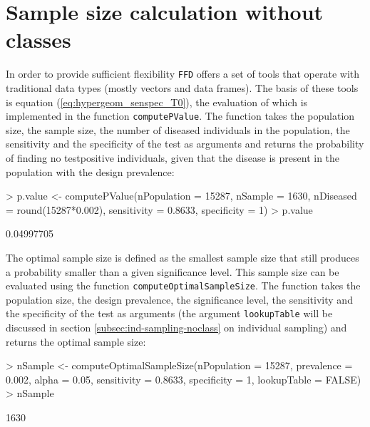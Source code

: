 \documentclass[nojss]{jss}
\begin{document}
%
%

\section{Sample size calculation without classes}
\label{sec:using-ffd-noclass}

In order to provide sufficient flexibility \texttt{FFD} offers a set 
of tools that operate with traditional data types (mostly vectors 
and data frames). The basis of these tools is equation 
(\ref{eq:hypergeom_senspec_T0}), the evaluation of which is 
implemented in the function \texttt{computePValue}. 
 The function takes the population 
size, the sample size, the number of diseased individuals in the 
population, the sensitivity and the specificity of the test as 
arguments and returns the probability of finding no testpositive 
individuals, given that the disease is present in the population 
with the design prevalence: 

\begin{Schunk}
\begin{Sinput}
> p.value <- computePValue(nPopulation = 15287, nSample = 1630, 
       nDiseased = round(15287*0.002), sensitivity = 0.8633, specificity = 1)
> p.value
\end{Sinput}
\begin{Soutput}
[1] 0.04997705
\end{Soutput}
\end{Schunk}

The optimal sample size is defined as the smallest sample size that 
still produces a probability smaller than a given significance 
level. This sample size can be evaluated using the function 
\texttt{computeOptimalSampleSize}. 
The function takes the 
population size, the design prevalence, the significance level, the 
sensitivity and the specificity of the test as arguments (the 
argument \texttt{lookupTable} will be discussed in section 
\ref{subsec:ind-sampling-noclass} on individual sampling) and 
returns the optimal sample size: 

\begin{Schunk}
\begin{Sinput}
> nSample <- computeOptimalSampleSize(nPopulation = 15287, 
       prevalence = 0.002, alpha = 0.05, sensitivity = 0.8633, 
       specificity = 1, lookupTable = FALSE)
> nSample 
\end{Sinput}
\begin{Soutput}
[1] 1630
\end{Soutput}
\end{Schunk}
\end{document}
